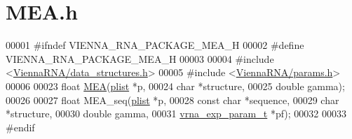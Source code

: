\hypertarget{MEA_8h_source}{}\section{M\+E\+A.\+h}
\label{MEA_8h_source}

\begin{DoxyCode}
00001 \textcolor{preprocessor}{#ifndef VIENNA\_RNA\_PACKAGE\_MEA\_H}
00002 \textcolor{preprocessor}{#define VIENNA\_RNA\_PACKAGE\_MEA\_H}
00003 
00004 \textcolor{preprocessor}{#include <\hyperlink{data__structures_8h}{ViennaRNA/data\_structures.h}>}
00005 \textcolor{preprocessor}{#include <\hyperlink{params_8h}{ViennaRNA/params.h}>}
00006 
00023 \textcolor{keywordtype}{float} \hyperlink{MEA_8h_a396ec6144c6a74fcbab4cea6b42d76c3}{MEA}(\hyperlink{group__data__structures_structvrna__plist__s}{plist} *p,
00024           \textcolor{keywordtype}{char} *structure,
00025           \textcolor{keywordtype}{double} gamma);
00026 
00027 \textcolor{keywordtype}{float} MEA\_seq(\hyperlink{group__data__structures_structvrna__plist__s}{plist} *p,
00028               \textcolor{keyword}{const} \textcolor{keywordtype}{char} *sequence,
00029               \textcolor{keywordtype}{char} *structure,
00030               \textcolor{keywordtype}{double} gamma,
00031               \hyperlink{group__energy__parameters_structvrna__exp__param__s}{vrna\_exp\_param\_t} *pf);
00032 
00033 \textcolor{preprocessor}{#endif}
\end{DoxyCode}
